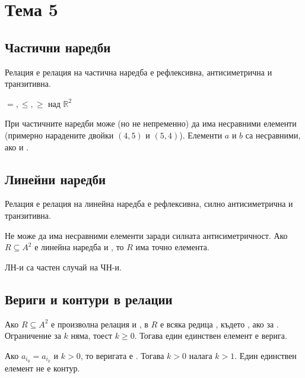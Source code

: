 \section{Тема 5} %

\subsection*{Частични наредби}
\begin{definition}
    Релация е релация на частична наредба \totw е рефлексивна, антисиметрична и транзитивна.
\end{definition}

\begin{example}
    \(=, \le, \ge\) над \(\mathbb{R}^2\)
\end{example}

При частичните наредби може (но не непременно) да има несравними елементи (примерно нарадените двойки 
\((4, 5)\) и \((5, 4)\)). Елементи \(a\) и \(b\) са несравними, ако  и .

\subsection*{Линейни наредби}
\begin{definition}
    Релация е релация на линейна наредба \totw е рефлексивна, силно антисиметрична и транзитивна.
\end{definition}

Не може да има несравними елементи заради силната антисиметричност.
Ако \(R \subseteq A^2\) е линейна наредба и , то \(R\) има точно 
 елемента.

ЛН-и са частен случай на ЧН-и.

\subsection*{Вериги и контури в релации}
Ако \(R \subseteq A^2\) е произволна релация и ,  в \(R\) е всяка
редица , където , ако 
 за . Ограничение за \(k\) няма, тоест \(k \ge 0\). 
Тогава един единствен елемент е верига.

Ако \(a_{i_0} = a_{i_k}\) и \(k > 0\), то веригата е . Тогава \(k > 0\) налага \(k > 1\). 
Един единствен елемент не е контур.

